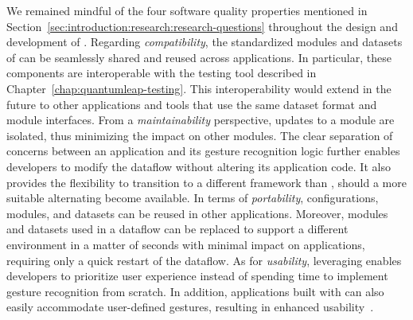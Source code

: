 We remained mindful of the four software quality properties mentioned in Section~\ref{sec:introduction:research:research-questions} throughout the design and development of \ql.
%
Regarding \textit{compatibility}, the standardized modules and datasets of \ql can be seamlessly shared and reused across applications. In particular, these components are interoperable with the testing tool described in Chapter~\ref{chap:quantumleap-testing}. This interoperability would extend in the future to other applications and tools that use the same dataset format and module interfaces.
%
From a \textit{maintainability} perspective, updates to a module are isolated, thus minimizing the impact on other modules. The clear separation of concerns between an application and its gesture recognition logic further enables developers to modify the dataflow without altering its application code. It also provides the flexibility to transition to a different framework than \ql, should a more suitable alternating become available. 
%
In terms of \textit{portability}, \ql configurations, modules, and datasets can be reused in other applications. Moreover, modules and datasets used in a dataflow can be replaced to support a different environment in a matter of seconds with minimal impact on applications, requiring only a quick restart of the dataflow. 
%
As for \textit{usability}, leveraging \ql enables developers to prioritize user experience instead of spending time to implement gesture recognition from scratch. In addition, applications built with \ql can also easily accommodate user-defined gestures, resulting in enhanced usability~\cite{Nacenta:2013}.

